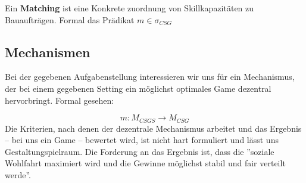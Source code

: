\begin{definition}[Matching]
  Ein \textbf{Matching} ist eine Konkrete zuordnung von Skillkapazitäten zu Bauaufträgen.
  Formal das Prädikat $m\in\sigma_{CSG}$
\end{definition}



\subsection{Mechanismen}


Bei der gegebenen Aufgabenstellung interessieren wir uns für ein Mechanismus, der bei einem gegebenen Setting ein möglichst optimales Game dezentral hervorbringt. Formal gesehen:

\begin{equation}
  m: M_{CSGS} \rightarrow M_{CSG}
\end{equation}
Die Kriterien, nach denen der dezentrale Mechanismus arbeitet und das Ergebnis -- bei uns ein Game -- bewertet wird, ist nicht hart formuliert und lässt uns Gestaltungspielraum. Die Forderung an das Ergebnis ist, dass die ''soziale Wohlfahrt maximiert wird und die Gewinne möglichst stabil und fair verteilt werde''.
